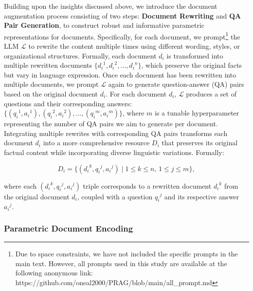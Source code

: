 \documentclass[sigconf,natbib=true,anonymous=false]{acmart}
\begin{document}
Building upon the insights discussed above, we introduce the document augmentation process consisting of two steps: \textbf{Document Rewriting} and \textbf{QA Pair Generation}, to construct robust and informative parametric representations for documents.
Specifically, for each document, we prompt\footnote{Due to space constraints, we have not included the specific prompts in the main text. However, all prompts used in this study are available at the following anonymous link: https://github.com/oneal2000/PRAG/blob/main/all\_prompt.md} the LLM $\mathcal L$ to {rewrite} the content multiple times using different wording, styles, or organizational structures. 
Formally, each document \( d_i \) is transformed into multiple rewritten documents \( \{ {d_i}^1, {d_i}^2, \dots, {d_i}^n \} \), which preserve the original facts but vary in language expression. 
Once each document has been rewritten into multiple documents, we prompt $\mathcal{L}$ again to generate {question-answer (QA) pairs} based on the original document \( d_i \). 
For each document \( d_i \), $\mathcal{L}$ produces a set of questions and their corresponding answers:
$\{({q_i}^1, {a_i}^1), ({q_i}^2, {a_i}^2), \dots, ({q_i}^m, {a_i}^m)\}$,
where \(m\) is a tunable hyperparameter representing the number of QA pairs we aim to generate per document. 
Integrating multiple rewrites with corresponding QA pairs transforms each document $d_i$ into a more comprehensive resource $D_i$ that preserves its original factual content while incorporating diverse linguistic variations. 
Formally:




\begin{equation}
\label{eq:1}
{D_i} = \{({d_i}^k, {{q_i}^j}, {{a_i}^j})\mid 1 \le k \le n,\, 1 \le j \le m\},
\end{equation}

\noindent where each \(({d_i}^k, {q_i}^j, {a_i}^j)\) triple corresponds to a rewritten document \({d_i}^k\) from the original document \(d_i\), coupled with a question \({q_i}^j\) and its respective answer \({a_i}^j\). 




\subsubsection{Parametric Document Encoding}
\label{sec:additional-param-training}
\end{document}
